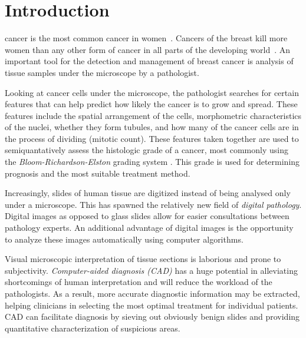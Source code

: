 \documentclass[journal]{IEEEtran}
\begin{document}
\section{Introduction}
% 
% 
% 
% 
 cancer is the most common cancer in women~\cite{cancerstats}. Cancers of the breast kill more women than any other form of cancer in all parts of the developing world~\cite{bcstats}. An important tool for the detection and management of breast cancer is analysis of tissue samples under the microscope by a pathologist.

Looking at cancer cells under the microscope, the pathologist searches for certain features that can help predict how likely the cancer is to grow and spread. These features include the spatial arrangement of the cells, morphometric characteristics of the nuclei, whether they form tubules, and how many of the cancer cells are in the process of dividing (mitotic count). These features taken together are used to semiquantatively assess the histologic grade of a cancer, most commonly using the \emph{Bloom-Richardson-Elston} grading system \cite{elston1991pathological}. This grade is used for determining prognosis and the most suitable treatment method.

Increasingly, slides of human tissue are digitized instead of being analysed only under a microscope. This has spawned the relatively new field of \emph{digital pathology}. Digital images as opposed to glass slides allow for  easier consultations between pathology experts. An additional advantage of digital images is the opportunity to analyze these images automatically using computer algorithms.

Visual microscopic interpretation of tissue sections is laborious and prone to subjectivity. \emph{Computer-aided diagnosis (CAD)} has a huge potential in alleviating shortcomings of human interpretation and will reduce the workload of the pathologists. As a result, more accurate diagnostic information may be extracted, helping clinicians in selecting the most optimal treatment for individual patients. CAD can facilitate diagnosis by sieving out obviously benign slides and providing quantitative characterization of suspicious areas.
\end{document}
